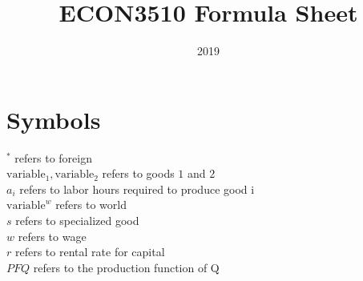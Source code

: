 \documentclass{article}
\title{ECON3510 Formula Sheet}
\date{2019}
\begin{document}
\maketitle

\section{Symbols}
$^{*}$ refers to foreign \\
$\text{variable}_{1},\text{variable}_{2}$ refers to goods $1$ and $2$ \\
$a_{i}$ refers to labor hours required to produce good i \\
$\text{variable}^{w}$ refers to world \\
$s$ refers to specialized good \\
$w$ refers to wage \\
$r$ refers to rental rate for capital \\
$PFQ$ refers to the production function of Q \\

\newpage
\end{document}
